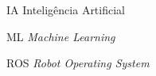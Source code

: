 \documentclass[12pt,oneside,a4paper,chapter=TITLE,section=TITLE,sumario
=tradicional]{abntex2}
\begin{document}

\imprimircapa
\imprimirfolhaderosto

\begin{resumo}
    
    

        
\end{resumo}

\listadefiguras
\listadequadros

\begin{siglas}
  \item[IA] Inteligência Artificial
  \item[ML] \textit{Machine Learning} 
  \item[ROS] \textit{Robot Operating System}
\end{siglas}


\sumario

\textual

\end{document}
